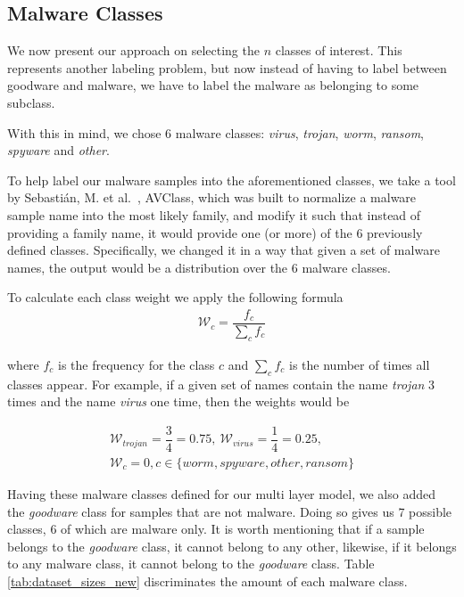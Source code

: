 \subsection{Malware Classes}

We now present our approach on selecting the $n$ classes of interest.
This represents another labeling problem, but now instead of having to label between goodware and malware, we have to label the malware as belonging to some subclass.

With this in mind, we chose 6 malware classes: \textit{virus}, \textit{trojan}, \textit{worm}, \textit{ransom}, \textit{spyware} and \textit{other}.

To help label our malware samples into the aforementioned classes, we take a tool by Sebastián, M. et al.~\cite{sebastian2016avclass}, AVClass, which was built to normalize a malware sample name into the most likely family, and modify it such that instead of providing a family name, it would provide one (or more) of the 6 previously defined classes.
Specifically, we changed it in a way that given a set of malware names, the output would be a distribution over the 6 malware classes.

To calculate each class weight we apply the following formula
\begin{eqnarray*}
	\mathcal{W}_c = \dfrac{f_c}{\sum\limits_{c}f_c}
\end{eqnarray*}

where $f_c$ is the frequency for the class $c$ and $\sum_{c}f_c$ is the number of times all classes appear.
For example, if a given set of names contain the name \textit{trojan} 3 times and the name \textit{virus} one time, then the weights would be

\begin{eqnarray*}
	\mathcal{W}_{trojan}=\dfrac{3}{4}=0.75,~\mathcal{W}_{virus}=\dfrac{1}{4}=0.25,\\\mathcal{W}_{c}=0, c \in \{worm, spyware, other, ransom\}
\end{eqnarray*}

\medskip

Having these malware classes defined for our multi layer model, we also added the \textit{goodware} class for samples that are not malware.
Doing so gives us 7 possible classes, 6 of which are malware only.
It is worth mentioning that if a sample belongs to the \textit{goodware} class, it cannot belong to any other, likewise, if it belongs to any malware class, it cannot belong to the \textit{goodware} class.
Table \ref{tab:dataset_sizes_new} discriminates the amount of each malware class.


